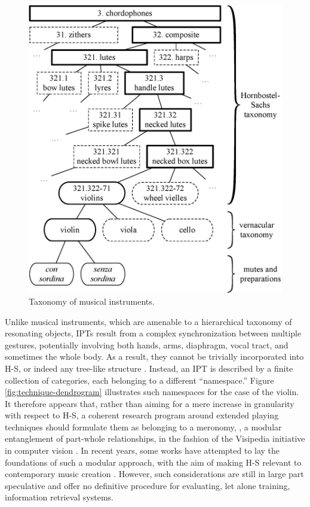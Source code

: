 \begin{figure}[t!]
\centering
\includegraphics[width=\linewidth]{./figs/dendrograms/instrument-dendrogram.eps}
\caption{Taxonomy of musical instruments.}
\label{fig:instrument-dendrogram}
\end{figure}

Unlike musical instruments, which are amenable to a hierarchical taxonomy of resonating objects, IPTs result from a complex synchronization between multiple gestures, potentially involving both hands, arms, diaphragm, vocal tract, and sometimes the whole body.
As a result, they cannot be trivially incorporated into H-S, or indeed any tree-like structure \cite{kolozali2011ismir}.
Instead, an IPT is described by a finite collection of categories, each belonging to a different ``name\-space.''
Figure \ref{fig:technique-dendrogram} illustrates such namespaces for the case of the violin.
It therefore appears that, rather than aiming for a mere increase in granularity with respect to H-S, a coherent research program around extended playing techniques should formulate them as belonging to a meronomy, \ie{}, a modular entanglement of part-whole relationships, in the fashion of the Visipedia initiative in computer vision \cite{belongie2015pattern}.
In recent years, some works have attempted to lay the foundations of such a modular approach, with the aim of making H-S relevant to contemporary music creation \cite{magnusson2017jnmr,weisser2011ytm}.
However, such considerations are still in large part speculative and offer no definitive procedure for evaluating, let alone training, information retrieval systems.

